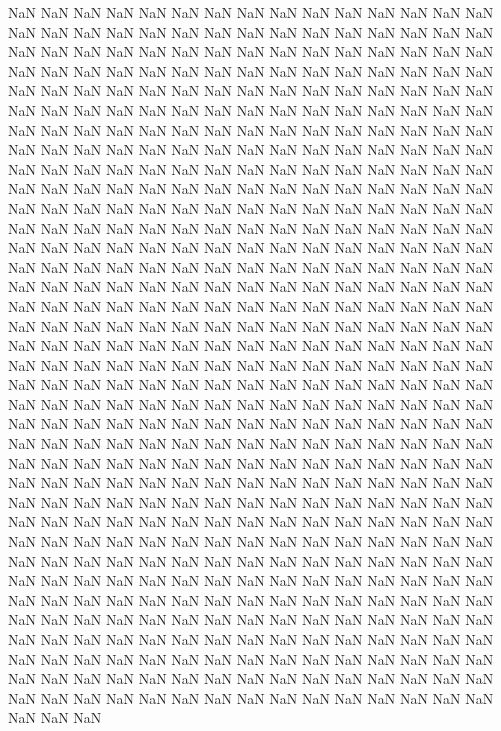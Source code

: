 NaN
NaN
NaN
NaN
NaN
NaN
NaN
NaN
NaN
NaN
NaN
NaN
NaN
NaN
NaN
NaN
NaN
NaN
NaN
NaN
NaN
NaN
NaN
NaN
NaN
NaN
NaN
NaN
NaN
NaN
NaN
NaN
NaN
NaN
NaN
NaN
NaN
NaN
NaN
NaN
NaN
NaN
NaN
NaN
NaN
NaN
NaN
NaN
NaN
NaN
NaN
NaN
NaN
NaN
NaN
NaN
NaN
NaN
NaN
NaN
NaN
NaN
NaN
NaN
NaN
NaN
NaN
NaN
NaN
NaN
NaN
NaN
NaN
NaN
NaN
NaN
NaN
NaN
NaN
NaN
NaN
NaN
NaN
NaN
NaN
NaN
NaN
NaN
NaN
NaN
NaN
NaN
NaN
NaN
NaN
NaN
NaN
NaN
NaN
NaN
NaN
NaN
NaN
NaN
NaN
NaN
NaN
NaN
NaN
NaN
NaN
NaN
NaN
NaN
NaN
NaN
NaN
NaN
NaN
NaN
NaN
NaN
NaN
NaN
NaN
NaN
NaN
NaN
NaN
NaN
NaN
NaN
NaN
NaN
NaN
NaN
NaN
NaN
NaN
NaN
NaN
NaN
NaN
NaN
NaN
NaN
NaN
NaN
NaN
NaN
NaN
NaN
NaN
NaN
NaN
NaN
NaN
NaN
NaN
NaN
NaN
NaN
NaN
NaN
NaN
NaN
NaN
NaN
NaN
NaN
NaN
NaN
NaN
NaN
NaN
NaN
NaN
NaN
NaN
NaN
NaN
NaN
NaN
NaN
NaN
NaN
NaN
NaN
NaN
NaN
NaN
NaN
NaN
NaN
NaN
NaN
NaN
NaN
NaN
NaN
NaN
NaN
NaN
NaN
NaN
NaN
NaN
NaN
NaN
NaN
NaN
NaN
NaN
NaN
NaN
NaN
NaN
NaN
NaN
NaN
NaN
NaN
NaN
NaN
NaN
NaN
NaN
NaN
NaN
NaN
NaN
NaN
NaN
NaN
NaN
NaN
NaN
NaN
NaN
NaN
NaN
NaN
NaN
NaN
NaN
NaN
NaN
NaN
NaN
NaN
NaN
NaN
NaN
NaN
NaN
NaN
NaN
NaN
NaN
NaN
NaN
NaN
NaN
NaN
NaN
NaN
NaN
NaN
NaN
NaN
NaN
NaN
NaN
NaN
NaN
NaN
NaN
NaN
NaN
NaN
NaN
NaN
NaN
NaN
NaN
NaN
NaN
NaN
NaN
NaN
NaN
NaN
NaN
NaN
NaN
NaN
NaN
NaN
NaN
NaN
NaN
NaN
NaN
NaN
NaN
NaN
NaN
NaN
NaN
NaN
NaN
NaN
NaN
NaN
NaN
NaN
NaN
NaN
NaN
NaN
NaN
NaN
NaN
NaN
NaN
NaN
NaN
NaN
NaN
NaN
NaN
NaN
NaN
NaN
NaN
NaN
NaN
NaN
NaN
NaN
NaN
NaN
NaN
NaN
NaN
NaN
NaN
NaN
NaN
NaN
NaN
NaN
NaN
NaN
NaN
NaN
NaN
NaN
NaN
NaN
NaN
NaN
NaN
NaN
NaN
NaN
NaN
NaN
NaN
NaN
NaN
NaN
NaN
NaN
NaN
NaN
NaN
NaN
NaN
NaN
NaN
NaN
NaN
NaN
NaN
NaN
NaN
NaN
NaN
NaN
NaN
NaN
NaN
NaN
NaN
NaN
NaN
NaN
NaN
NaN
NaN
NaN
NaN
NaN
NaN
NaN
NaN
NaN
NaN
NaN
NaN
NaN
NaN
NaN
NaN
NaN
NaN
NaN
NaN
NaN
NaN
NaN
NaN
NaN
NaN
NaN
NaN
NaN
NaN
NaN
NaN
NaN
NaN
NaN
NaN
NaN
NaN
NaN
NaN
NaN
NaN
NaN
NaN
NaN
NaN
NaN
NaN
NaN
NaN
NaN
NaN
NaN
NaN
NaN
NaN
NaN
NaN
NaN
NaN
NaN
NaN
NaN
NaN
NaN
NaN
NaN
NaN
NaN
NaN
NaN
NaN
NaN
NaN
NaN
NaN
NaN
NaN
NaN
NaN
NaN
NaN
NaN
NaN
NaN
NaN
NaN
NaN
NaN
NaN
NaN
NaN
NaN
NaN
NaN
NaN
NaN
NaN
NaN
NaN
NaN
NaN
NaN
NaN
NaN
NaN
NaN
NaN
NaN
NaN
NaN
NaN
NaN
NaN
NaN
NaN
NaN
NaN
NaN
NaN
NaN
NaN
NaN
NaN
NaN
NaN
NaN
NaN
NaN
NaN
NaN
NaN
NaN
NaN
NaN
NaN
NaN
NaN
NaN
NaN
NaN
NaN
NaN
NaN
